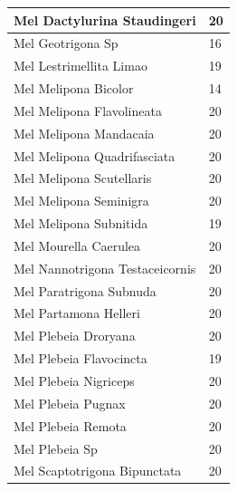 \documentclass[
	12pt,				%
	oneside,			%
	a4paper,			%
	english,			%
	brazil				%
	]{abntex2ppgsi}
\begin{document}
\begin{longtable}[c]{|l|l|}
Mel Dactylurina Staudingeri     & 20                                         \\ \hline
Mel Geotrigona Sp               & 16                                         \\ \hline
Mel Lestrimellita Limao         & 19                                         \\ \hline
Mel Melipona Bicolor            & 14                                         \\ \hline
Mel Melipona Flavolineata       & 20                                         \\ \hline
Mel Melipona Mandacaia          & 20                                         \\ \hline
Mel Melipona Quadrifasciata     & 20                                         \\ \hline
Mel Melipona Scutellaris        & 20                                         \\ \hline
Mel Melipona Seminigra          & 20                                         \\ \hline
Mel Melipona Subnitida          & 19                                         \\ \hline
Mel Mourella Caerulea           & 20                                         \\ \hline
Mel Nannotrigona Testaceicornis & 20                                         \\ \hline
Mel Paratrigona Subnuda         & 20                                         \\ \hline
Mel Partamona Helleri           & 20                                         \\ \hline
Mel Plebeia Droryana            & 20                                         \\ \hline
Mel Plebeia Flavocincta         & 19                                         \\ \hline
Mel Plebeia Nigriceps           & 20                                         \\ \hline
Mel Plebeia Pugnax              & 20                                         \\ \hline
Mel Plebeia Remota              & 20                                         \\ \hline
Mel Plebeia Sp                  & 20                                         \\ \hline
Mel Scaptotrigona Bipunctata    & 20                                         \\ \hline

\end{longtable}
\end{document}
